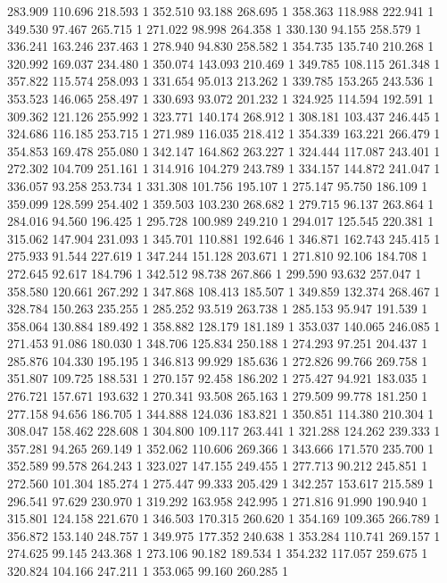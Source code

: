 	283.909	110.696	218.593	1
	352.510	93.188	268.695	1
	358.363	118.988	222.941	1
	349.530	97.467	265.715	1
	271.022	98.998	264.358	1
	330.130	94.155	258.579	1
	336.241	163.246	237.463	1
	278.940	94.830	258.582	1
	354.735	135.740	210.268	1
	320.992	169.037	234.480	1
	350.074	143.093	210.469	1
	349.785	108.115	261.348	1
	357.822	115.574	258.093	1
	331.654	95.013	213.262	1
	339.785	153.265	243.536	1
	353.523	146.065	258.497	1
	330.693	93.072	201.232	1
	324.925	114.594	192.591	1
	309.362	121.126	255.992	1
	323.771	140.174	268.912	1
	308.181	103.437	246.445	1
	324.686	116.185	253.715	1
	271.989	116.035	218.412	1
	354.339	163.221	266.479	1
	354.853	169.478	255.080	1
	342.147	164.862	263.227	1
	324.444	117.087	243.401	1
	272.302	104.709	251.161	1
	314.916	104.279	243.789	1
	334.157	144.872	241.047	1
	336.057	93.258	253.734	1
	331.308	101.756	195.107	1
	275.147	95.750	186.109	1
	359.099	128.599	254.402	1
	359.503	103.230	268.682	1
	279.715	96.137	263.864	1
	284.016	94.560	196.425	1
	295.728	100.989	249.210	1
	294.017	125.545	220.381	1
	315.062	147.904	231.093	1
	345.701	110.881	192.646	1
	346.871	162.743	245.415	1
	275.933	91.544	227.619	1
	347.244	151.128	203.671	1
	271.810	92.106	184.708	1
	272.645	92.617	184.796	1
	342.512	98.738	267.866	1
	299.590	93.632	257.047	1
	358.580	120.661	267.292	1
	347.868	108.413	185.507	1
	349.859	132.374	268.467	1
	328.784	150.263	235.255	1
	285.252	93.519	263.738	1
	285.153	95.947	191.539	1
	358.064	130.884	189.492	1
	358.882	128.179	181.189	1
	353.037	140.065	246.085	1
	271.453	91.086	180.030	1
	348.706	125.834	250.188	1
	274.293	97.251	204.437	1
	285.876	104.330	195.195	1
	346.813	99.929	185.636	1
	272.826	99.766	269.758	1
	351.807	109.725	188.531	1
	270.157	92.458	186.202	1
	275.427	94.921	183.035	1
	276.721	157.671	193.632	1
	270.341	93.508	265.163	1
	279.509	99.778	181.250	1
	277.158	94.656	186.705	1
	344.888	124.036	183.821	1
	350.851	114.380	210.304	1
	308.047	158.462	228.608	1
	304.800	109.117	263.441	1
	321.288	124.262	239.333	1
	357.281	94.265	269.149	1
	352.062	110.606	269.366	1
	343.666	171.570	235.700	1
	352.589	99.578	264.243	1
	323.027	147.155	249.455	1
	277.713	90.212	245.851	1
	272.560	101.304	185.274	1
	275.447	99.333	205.429	1
	342.257	153.617	215.589	1
	296.541	97.629	230.970	1
	319.292	163.958	242.995	1
	271.816	91.990	190.940	1
	315.801	124.158	221.670	1
	346.503	170.315	260.620	1
	354.169	109.365	266.789	1
	356.872	153.140	248.757	1
	349.975	177.352	240.638	1
	353.284	110.741	269.157	1
	274.625	99.145	243.368	1
	273.106	90.182	189.534	1
	354.232	117.057	259.675	1
	320.824	104.166	247.211	1
	353.065	99.160	260.285	1
